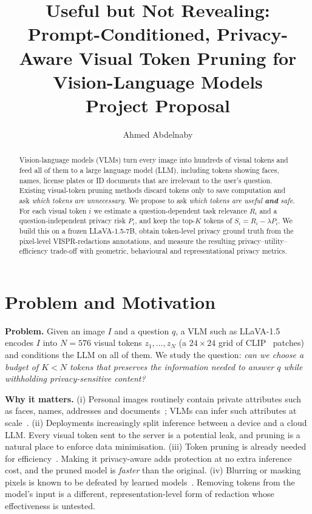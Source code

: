 \documentclass[10pt]{article}
\title{\vspace{-1.5em}\textbf{Useful but Not Revealing:}\\
Prompt-Conditioned, Privacy-Aware Visual Token Pruning for Vision-Language Models\\[2pt]
\large Project Proposal}
\author{Ahmed Abdelnaby}
\date{}
\newcommand{\R}{R}
\renewcommand{\Pr}{P}
\begin{document}
\maketitle
\vspace{-2.5em}

\begin{abstract}
\noindent
Vision-language models (VLMs) turn every image into hundreds of visual tokens and feed all of them to a large language model (LLM),
including tokens showing faces, names, license plates or ID documents that are irrelevant to the user's question.
Existing visual-token pruning methods discard tokens only to save computation and ask \emph{which tokens are unnecessary}.
We propose to ask \emph{which tokens are useful \textbf{and} safe}. For each visual token $i$ we estimate a
question-dependent task relevance $\R_i$ and a question-independent privacy risk $\Pr_i$, and keep the top-$K$ tokens
of $S_i=\R_i-\lambda \Pr_i$. We build this on a frozen LLaVA-1.5-7B, obtain token-level privacy ground truth from the
pixel-level VISPR-redactions annotations, and measure the resulting privacy--utility--efficiency trade-off with geometric,
behavioural and representational privacy metrics.
\end{abstract}

\section{Problem and Motivation}
\textbf{Problem.} Given an image $I$ and a question $q$, a VLM such as LLaVA-1.5~\cite{liu2024llava15} encodes $I$ into
$N=576$ visual tokens $z_1,\dots,z_N$ (a $24{\times}24$ grid of CLIP~\cite{radford2021clip} patches) and conditions the LLM on all of them.
We study the question: \emph{can we choose a budget of $K<N$ tokens that preserves the information needed to answer $q$ while
withholding privacy-sensitive content?}

\textbf{Why it matters.} (i) Personal images routinely contain private attributes such as faces, names, addresses and documents~\cite{orekondy2017vispr};
VLMs can infer such attributes at scale~\cite{tomekce2024private}. (ii) Deployments increasingly split inference between a device and a cloud LLM.
Every visual token sent to the server is a potential leak, and pruning is a natural place to enforce data minimisation.
(iii) Token pruning is already needed for efficiency~\cite{chen2024fastv,zhang2025sparsevlm,zhang2025vispruner,alvar2025divprune}.
Making it privacy-aware adds protection at no extra inference cost, and the pruned model is \emph{faster} than the original.
(iv) Blurring or masking pixels is known to be defeated by learned models~\cite{mcpherson2016defeating}.
Removing tokens from the model's input is a different, representation-level form of redaction whose effectiveness is untested.
\end{document}
